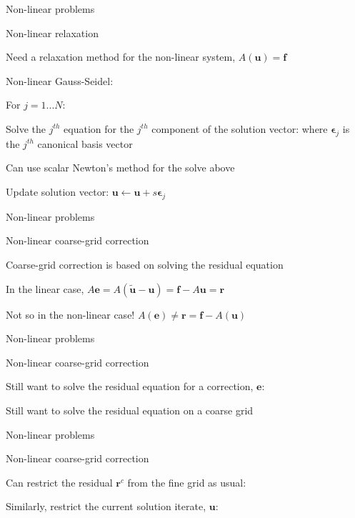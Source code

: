 \documentclass[18pt,xcolor=table]{beamer}
\begin{document}
\begin{frame}{Non-linear problems}
\begin{block}{Non-linear relaxation}
\bit
\item Need a relaxation method for the non-linear system, $A(\mathbf{u}) = \mathbf{f}$
\item Non-linear Gauss-Seidel: 
\bit
\item For $j = 1...N$:
\item Solve the $j^{th}$ equation for the $j^{th}$ component of the solution vector:
where $\mathbf{\epsilon}_j$ is the $j^{th}$ canonical basis vector
\item Can use scalar Newton's method for the solve above
\item Update solution vector: $\mathbf{u} \leftarrow \mathbf{u} + s\mathbf{\epsilon}_j$
\eit
\eit
\end{block}
\end{frame}

\begin{frame}{Non-linear problems}
\begin{block}{Non-linear coarse-grid correction}
\bit
\item Coarse-grid correction is based on solving the residual equation
\item In the linear case, $A\mathbf{e} = A(\mathbf{\tilde{u}} - \mathbf{u}) = \mathbf{f} - A\mathbf{u} = \mathbf{r}$
\item Not so in the non-linear case! $A(\mathbf{e}) \neq  \mathbf{r} = \mathbf{f} - A(\mathbf{u})$
\eit
\end{block}
\end{frame}

\begin{frame}{Non-linear problems}
\begin{block}{Non-linear coarse-grid correction}
\bit
\item Still want to solve the residual equation for a correction, $\mathbf{e}$:
\item Still want to solve the residual equation on a coarse grid
\eit
\end{block}
\end{frame}

\begin{frame}{Non-linear problems}
\begin{block}{Non-linear coarse-grid correction}
\bit
\item Can restrict the residual $\mathbf{r}^c$ from the fine grid as usual:
\item Similarly, restrict the current solution iterate, $\mathbf{u}$:
\eit
\end{block}
\end{frame}
\end{document}
